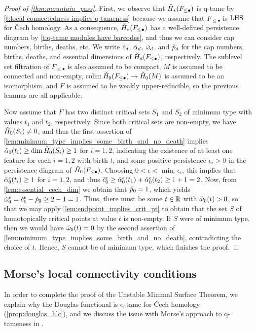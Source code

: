 \begin{proof}[Proof of \cref{thm:mountain_pass}]
    First, we observe that $\check{H}_*(F_{\leq \bullet})$ is q-tame by \cref{t:local connectedness implies q-tameness} because we assume that $F_{\leq \bullet}$ is $\mathrm{LHS}$ for \v{C}ech homology.
    As a consequence, $\check{H}_*(F_{\leq \bullet})$ has a well-defined persistence diagram by \cref{t:q-tame modules have barcodes}, and thus we can consider cap numbers, births, deaths, etc.
    We write $\check{c}_d$, $\check{\alpha}_d$, $\check{\omega}_d$, and $\check{p}_d$ for the cap numbers, births, deaths, and essential dimensions of $\check{H}_d(F_{\leq \bullet})$, respectively.
    The sublevel set filtration of $F_{\leq \bullet}$ is also assumed to be compact, $M$ is assumed to be connected and non-empty, $\operatorname*{colim} \check{H}_0(F_{\leq \bullet}) \to \check{H}_0(M)$ is assumed to be an isomorphism, and $F$ is assumed to be weakly upper-reducible, so the previous lemmas are all applicable.

	Now assume that $F$ has two distinct critical sets $S_{1}$ and $S_{2}$ of minimum type with values $t_{1}$ and $t_{2}$, respectively.
	Since both critical sets are non-empty, we have $\check{H}_{0}(S_{i}) \neq 0$, and thus the first assertion of \cref{lem:minimum_type_implies_some_birth_and_no_death} implies $\check{\alpha}_{0}(t_{i}) \geq \dim \check{H}_0(S_{i}) \geq 1$ for $i = 1,2$,
	indicating the existence of at least one feature for each $i = 1,2$ with birth $t_{i}$ and some positive persistence $\epsilon_i > 0$ in the persistence diagram of $\check{H}_0(F_{\leq \bullet})$.
	Choosing $0 < \epsilon < \min_i \epsilon_i$, this implies that
	$\check{\alpha}_{0}^{\epsilon}(t_{i}) \geq 1$ for $i = 1,2$,
	and thus
	$\check{c}_{0}^{\epsilon} \geq \check{\alpha}_{0}^{\epsilon}(t_{1}) + \check{\alpha}_{0}^{\epsilon}(t_{2}) \geq 1 + 1 = 2$.
	Now, from \cref{lem:essential_cech_dim} we obtain that $\check{p}_{0} = 1$, which yields $\check{\omega}_{0}^{\epsilon} = \check{c}_{0}^{\epsilon} - \check{p}_{0} \geq 2 - 1 = 1$.
	Thus, there must be some $t \in \mathbb{R}$ with $\check{\omega}_{0}(t) > 0$, so that we may apply \cref{lem:endpoint_implies_crit_pt} to obtain that the set $S$ of homotopically critical points at value $t$ is non-empty.
	If $S$ were of minimum type, then we would have $\check{\omega}_{0}(t) = 0$ by the second assertion of \cref{lem:minimum_type_implies_some_birth_and_no_death}, contradicting the choice of $t$.
	Hence, $S$ cannot be of minimum type, which finishes the proof.
\end{proof}

\subsection{Morse's local connectivity conditions}\label{subsec:historic_hlc}
In order to complete the proof of the Unstable Minimal Surface Theorem, we explain why the Douglas functional is q-tame for \v{C}ech homology (\cref{prop:douglas_hlc}), and we discuss the issue with Morse's approach to q-tameness in \cite[Theorem 6.3]{Morse.1940}.

